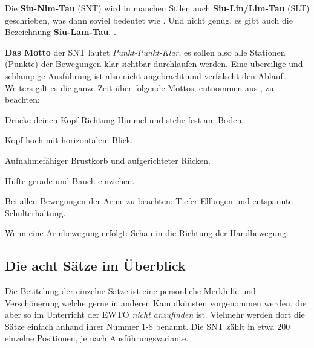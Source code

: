 \begin{WTCommonBegriff}
	Die \textbf{Siu-Nim-Tau} (SNT) wird in manchen Stilen auch \textbf{Siu-Lin/Lim-Tau} (SLT) geschrieben, was dann soviel bedeutet wie . Und nicht genug, es gibt auch die Bezeichnung \textbf{Siu-Lam-Tau}, .
\end{WTCommonBegriff}


\textbf{Das Motto} der SNT lautet \textit{Punkt-Punkt-Klar}, es sollen also alle Stationen (Punkte) der Bewegungen klar sichtbar durchlaufen werden. Eine \"ubereilige und schlampige Ausf\"uhrung ist also nicht angebracht und verf\"alscht den Ablauf. Weiters gilt es die ganze Zeit \"uber folgende Mottos, entnommen aus \cite{WTBIBLeu11}, zu beachten:

\begin{itemizeNarrow}
	\item Dr\"ucke deinen Kopf Richtung Himmel und stehe fest am Boden.
	\item Kopf hoch mit horizontalem Blick.
	\item Aufnahmef\"ahiger Brustkorb und aufgerichteter R\"ucken.
	\item H\"ufte gerade und Bauch einziehen.
	\item Bei allen Bewegungen der Arme zu beachten: Tiefer Ellbogen und entspannte Schulterhaltung.
	\item Wenn eine Armbewegung erfolgt: Schau in die Richtung der Handbewegung.
\end{itemizeNarrow}




\subsection*{Die acht S\"atze im \"Uberblick}

Die Betitelung der einzelne S\"atze ist eine pers\"onliche Merkhilfe und Versch\"onerung welche gerne in anderen Kampfk\"unsten vorgenommen werden, die aber so im Unterricht der EWTO \textit{nicht anzufinden} ist. Vielmehr werden dort die S\"atze einfach anhand ihrer Nummer 1-8 benannt. Die SNT z\"ahlt in etwa 200 einzelne Positionen, je nach Ausf\"uhrungsvariante.



